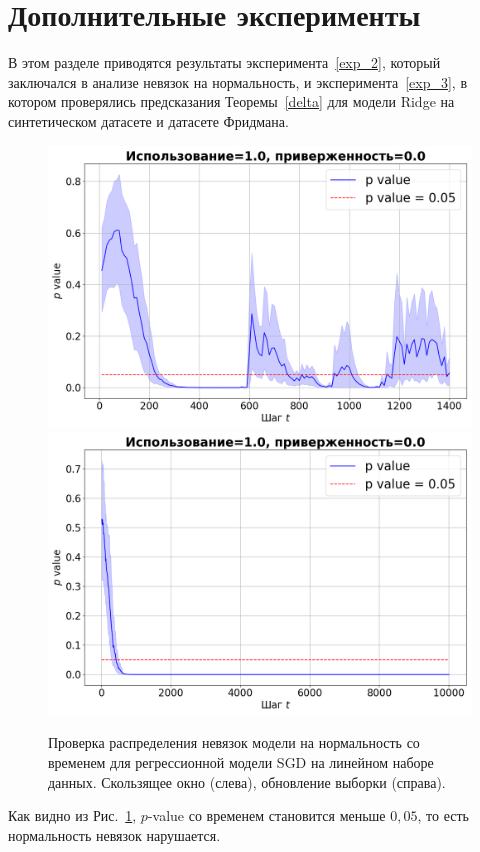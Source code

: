 \section{Дополнительные эксперименты} \label{Appendix}

    В этом разделе приводятся результаты эксперимента~\ref{exp_2}, который заключался в анализе невязок на нормальность, и эксперимента~\ref{exp_3}, в котором проверялись предсказания Теоремы~\ref{delta} для модели Ridge на синтетическом датасете и датасете Фридмана.

    \begin{figure}[ht]
        \centering
        \includegraphics[width=0.49\linewidth]{pictures/p_sw_synthetic_sgd_model_50_1.0_0.0.png}
        \includegraphics[width=0.49\linewidth]{pictures/p_su_synthetic_sgd_model_50_1.0_0.0.png}
        
        \caption{Проверка распределения невязок модели на нормальность со временем для регрессионной модели SGD на линейном наборе данных. Скользящее окно (слева), обновление выборки (справа).}
        \label{p_value}
    \end{figure}

    Как видно из Рис.~\ref{p_value}, $p$-value со временем становится меньше $0,05$, то есть нормальность невязок нарушается.

